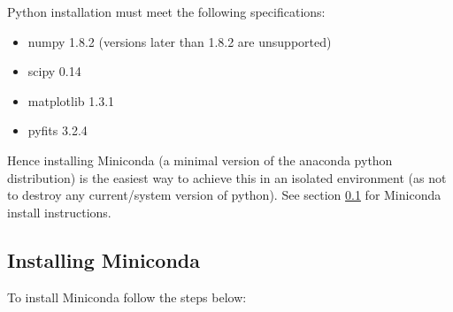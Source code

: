 \noindent Python installation must meet the following specifications:

\begin{itemize}
\item  numpy 1.8.2 (versions later than 1.8.2 are unsupported)
\item  scipy 0.14
\item  matplotlib 1.3.1
\item  pyfits 3.2.4 
\end{itemize}

\noindent Hence installing Miniconda (a minimal version of the anaconda python distribution) is the easiest way to achieve this in an isolated environment (as not to destroy any current/system version of python). See section \ref{section:install-miniconda} for Miniconda install instructions.


\subsection{Installing Miniconda}
\label{section:install-miniconda}

To install Miniconda follow the steps below:

